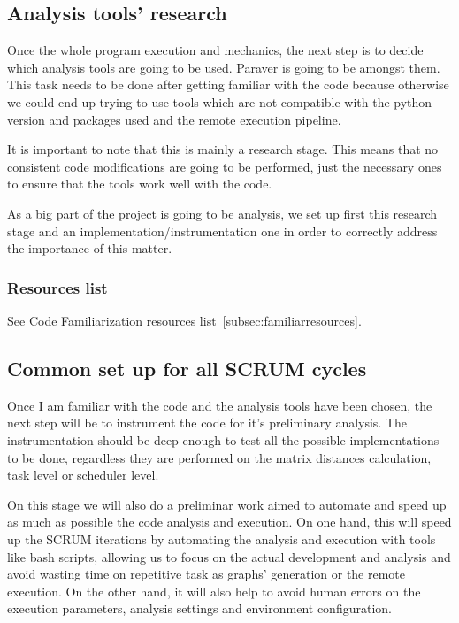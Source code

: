 \subsection{Analysis tools' research}

Once the whole program execution and mechanics, the next step is to decide which analysis tools are going to be used. Paraver is going to be amongst them. This task needs to be done after getting familiar with the code because otherwise we could end up trying to use tools which are not compatible with the python version and packages used and the remote execution pipeline.

It is important to note that this is mainly a research stage. This means that no consistent code modifications are going to be performed, just the necessary ones to ensure that the tools work well with the code.

As a big part of the project is going to be analysis, we set up first this research stage and an implementation/instrumentation one in order to correctly address the importance of this matter.

\subsubsection{Resources list}
See \hypertarget{subsec:familiarresources}{Code Familiarization resources list~\ref{subsec:familiarresources}}.

\subsection{Common set up for all SCRUM cycles}
\label{subsec:setup}

Once I am familiar with the code and the analysis tools have been chosen, the next step will be to instrument the code for it's preliminary analysis. The instrumentation should be deep enough to test all the possible implementations to be done, regardless they are performed on the matrix distances calculation, task level or scheduler level.

On this stage we will also do a preliminar work aimed to automate and speed up as much as possible the code analysis and execution. On one hand, this will speed up the SCRUM iterations by automating the analysis and execution with tools like bash scripts, allowing us to focus on the actual development and analysis and avoid wasting time on repetitive task as graphs' generation or the remote execution. On the other hand, it will also help to avoid human errors on the execution parameters, analysis settings and environment configuration.


